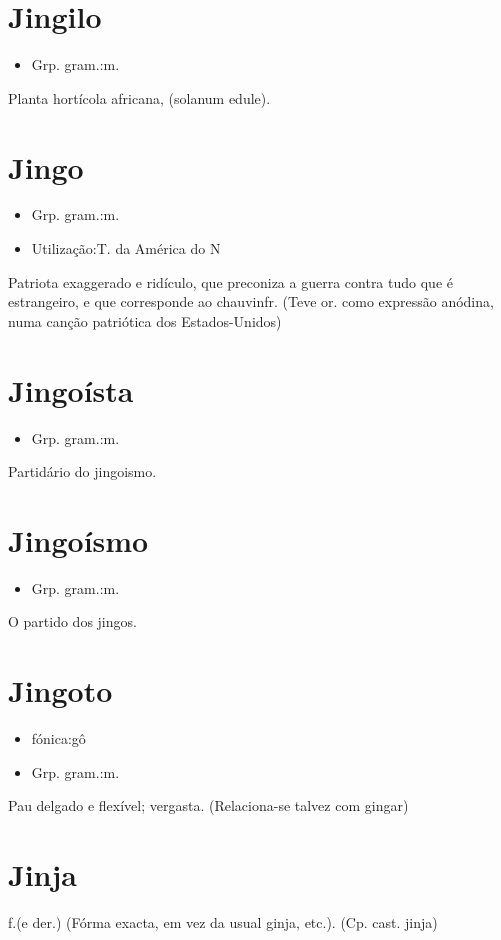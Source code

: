 \documentclass{article}
\begin{document}
\section{Jingilo}
\begin{itemize}
\item {Grp. gram.:m.}
\end{itemize}
Planta hortícola africana, (\textunderscore solanum edule\textunderscore ).
\section{Jingo}
\begin{itemize}
\item {Grp. gram.:m.}
\end{itemize}
\begin{itemize}
\item {Utilização:T. da América do N}
\end{itemize}
Patriota exaggerado e ridículo, que preconiza a guerra contra tudo que é estrangeiro, e que corresponde ao \textunderscore chauvin\textunderscore  fr.
(Teve or. como expressão anódina, numa canção patriótica dos Estados-Unidos)
\section{Jingoísta}
\begin{itemize}
\item {Grp. gram.:m.}
\end{itemize}
Partidário do jingoismo.
\section{Jingoísmo}
\begin{itemize}
\item {Grp. gram.:m.}
\end{itemize}
O partido dos jingos.
\section{Jingoto}
\begin{itemize}
\item {fónica:gô}
\end{itemize}
\begin{itemize}
\item {Grp. gram.:m.}
\end{itemize}
Pau delgado e flexível; vergasta.
(Relaciona-se talvez com \textunderscore gingar\textunderscore )
\section{Jinja}
\textunderscore f.\textunderscore  (e der.)
(Fórma exacta, em vez da usual \textunderscore ginja\textunderscore , etc.).
(Cp. cast. \textunderscore jinja\textunderscore )
\end{document}
